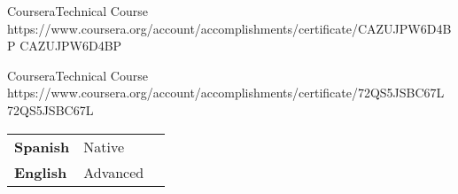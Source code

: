 \documentclass[a4paper,10pt]{article}
\begin{document}

{Coursera}{Technical Course}
{%
\vspace{-0.8em}
}
{https://www.coursera.org/account/accomplishments/certificate/CAZUJPW6D4BP}
{CAZUJPW6D4BP}


{Coursera}{Technical Course}
{%
\vspace{-0.8em}
}
{https://www.coursera.org/account/accomplishments/certificate/72QS5JSBC67L}
{72QS5JSBC67L}





\begin{adjustwidth}{2.5em}{0em}
\begin{tabularx}{\textwidth}{X X X}
  \textbf{Spanish} & Native & \\
  \textbf{English} & Advanced & \\
\end{tabularx}
\end{adjustwidth}
\end{document}
